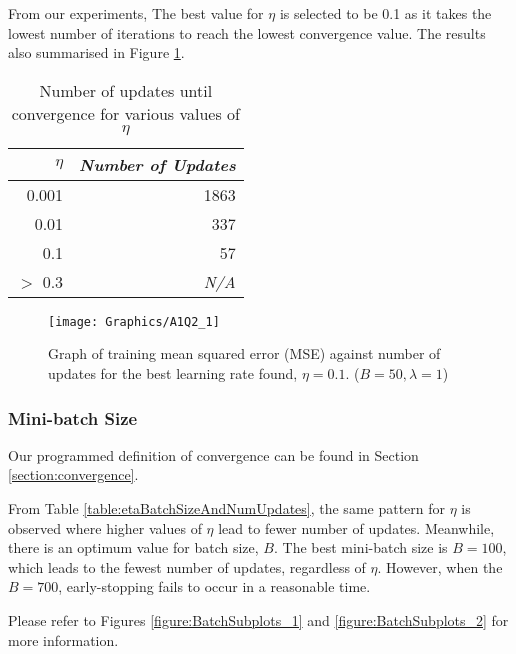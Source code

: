 \documentclass[a4paper,12pt]{article}
\begin{document}
From our experiments, The best value for $\eta$ is selected to be 0.1 as it takes the lowest number of iterations to reach the lowest convergence value. The results also summarised in Figure \ref{figure:BestEta}.

\begin{table}[ht]
	\centering %
    \caption{Number of updates until convergence for various values of 
    	$\eta$} %
	\label{table:etaAndNumUpdates} %
    \vspace{1em}
	\begin{tabular}{r r}
		\hline %
		$\eta$ & \textit{Number of Updates} \\ 
        [0.5ex] 
		\hline
		0.001 & 1863 \\
		0.01 & 337 \\
		0.1 & 57 \\
        $>$ 0.3 & \textit{N/A} \\
        [1ex] %
		\hline %
	\end{tabular}
\end{table}
\begin{figure}[!htb]
	\centering
	\texttt{[image: Graphics/A1Q2\_1]}
    \caption{\label{figure:BestEta}Graph of training mean squared error
    	(MSE) against number of updates for the best learning rate found, 
    	$\eta = 0.1$. ($B = 50, \lambda = 1$)}
\end{figure}
\clearpage
\subsubsection{Mini-batch Size}
Our programmed definition of convergence can be found in Section \ref{section:convergence}. 

From Table \ref{table:etaBatchSizeAndNumUpdates}, the same pattern for $\eta$ is observed where higher values of $\eta$ lead to fewer number of updates. Meanwhile, there is an optimum value for batch size, $B$. The best mini-batch size is $B = 100$, which leads to the fewest number of updates, regardless of $\eta$. However, when the $B = 700$, early-stopping fails to occur in a reasonable time. 

Please refer to Figures \ref{figure:BatchSubplots_1} and \ref{figure:BatchSubplots_2} for more information.
\end{document}
